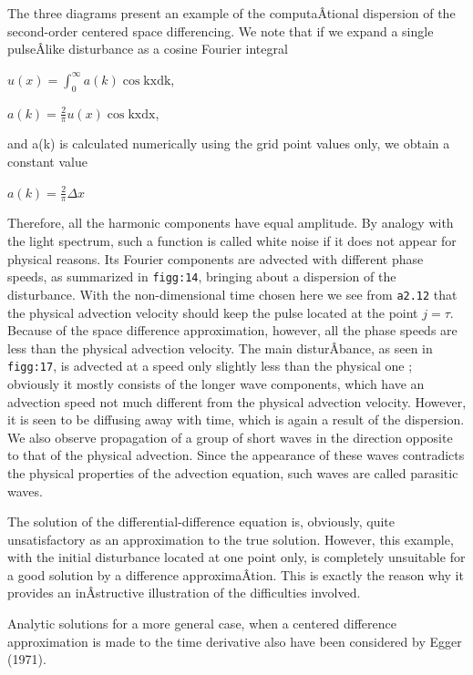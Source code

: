 The three diagrams present an example of the computaÂ­tional dispersion
of the second-order centered space differencing. We note that if we
expand a single pulseÂ­like disturbance as a cosine Fourier integral

\(u\left( x \right) = \int_{0}^{\infty}{a\left( k \right)\cos\text{kxdk}}\),

\(a\left( k \right) = \frac{2}{\pi}u\left( x \right)\cos\text{kxdx}\),

and a(k) is calculated numerically using the grid point values only, we
obtain a constant value

\(a\left( k \right) = \frac{2}{\pi}\Delta x\)

Therefore, all the harmonic components have equal amplitude. By analogy
with the light spectrum, such a function is called white noise if it
does not appear for physical reasons. Its Fourier components are
advected with different phase speeds, as summarized in \texttt{figg:14},
bringing about a dispersion of the disturbance. With the non-dimensional
time chosen here we see from \texttt{a2.12} that the physical advection
velocity should keep the pulse located at the point \(j = \tau.\)
Because of the space difference approximation, however, all the phase
speeds are less than the physical advection velocity. The main
disturÂ­bance, as seen in \texttt{figg:17}, is advected at a speed only
slightly less than the physical one ; obviously it mostly consists of
the longer wave components, which have an advection speed not much
different from the physical advection velocity. However, it is seen to
be diffusing away with time, which is again a result of the dispersion.
We also observe propagation of a group of short waves in the direction
opposite to that of the physical advection. Since the appearance of
these waves contradicts the physical properties of the advection
equation, such waves are called parasitic waves.

The solution of the differential-difference equation is, obviously,
quite unsatisfactory as an approximation to the true solution. However,
this example, with the initial disturbance located at one point only, is
completely unsuitable for a good solution by a difference
approximaÂ­tion. This is exactly the reason why it provides an
inÂ­structive illustration of the difficulties involved.

Analytic solutions for a more general case, when a centered difference
approximation is made to the time derivative also have been considered
by Egger (1971).

